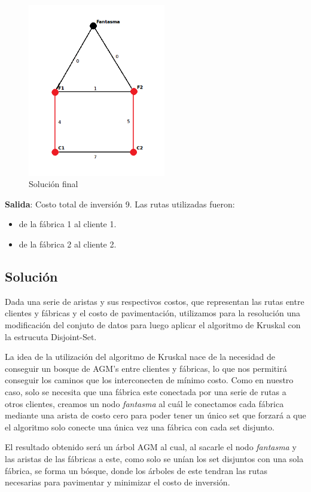 \documentclass[a4paper, 10pt, twoside]{article}
\begin{document}
\begin{figure}[H]
\centering
\includegraphics[width=60mm]{../ejemplo_graficos/CosoDosSubconjuntosSolucionSinFantasma.png}
\caption{Solución final}
\label{5}
\end{figure} 

\textbf{Salida}: Costo total de inversión 9. Las rutas utilizadas fueron:
\begin{itemize}
\item{de la fábrica 1 al cliente 1.}
\item{de la fábrica 2 al cliente 2.}
\end{itemize}

\subsection{Solución}

Dada una serie de aristas y sus respectivos costos, que representan las rutas entre clientes y fábricas y el costo de pavimentación, utilizamos para la resolución una modificación del conjuto de datos para luego aplicar el algoritmo de Kruskal con la estrucuta Disjoint-Set.

La idea de la utilización del algoritmo de Kruskal nace de la necesidad de conseguir un bosque de AGM's entre clientes y fábricas, lo que nos permitirá conseguir los caminos que los interconecten de mínimo costo. Como en nuestro caso, solo se necesita que una fábrica este conectada por una serie de rutas a otros clientes, creamos un nodo \textit{fantasma} al cuál le conectamos cada fábrica mediante una arista de costo cero para poder tener un único set que forzará a que el algoritmo solo conecte una única vez una fábrica con cada set disjunto.

El resultado obtenido será un árbol AGM al cual, al sacarle el nodo \textit{fantasma} y las aristas de las fábricas a este, como solo se unían los set disjuntos con una sola fábrica, se forma un bósque, donde los árboles de este tendran las rutas necesarias para pavimentar y minimizar el costo de inversión.
\end{document}
